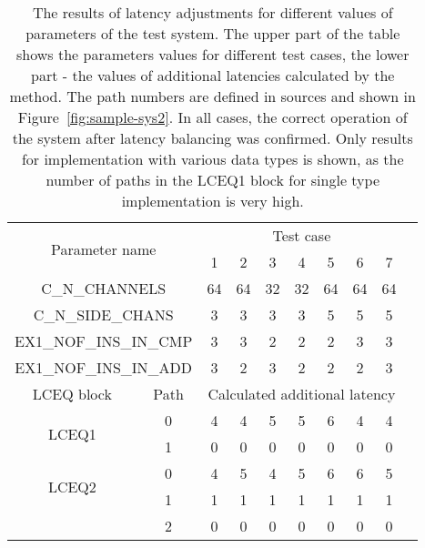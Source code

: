\documentclass[preprint,11pt]{elsarticle}
\begin{document}
\begin{table}[tp]
  \caption[results]
  { \label{tab:results-latencies}
    The results of latency adjustments for different values of parameters of the test system.
    The upper part of the table shows the parameters values for different test cases, the lower
    part - the values of additional latencies calculated by the method. The path numbers are defined
    in sources and shown in Figure~\ref{fig:sample-sys2}.
    In all cases, the correct operation of the system after latency balancing was confirmed.
    Only results for implementation with various data types is shown, as the number of paths
    in the LCEQ1 block for single type implementation is very high.
  }
\begin{center}
{\small
\begin{tabular}{|c|c|c|c|c|c|c|c|c|c|}
\hline
\multicolumn{2}{|c}{\multirow{2}{*}{Parameter name}} &
\multicolumn{7}{|c|}{Test case}\\
\cline{3-9}
\multicolumn{2}{|c|}{}                                 & 1  & 2 & 3 & 4 & 5 & 6 & 7 \\
\hline
\multicolumn{2}{|c|}{C\_N\_CHANNELS}                   & 64 & 64 & 32 & 32  & 64 & 64 & 64 \\
\multicolumn{2}{|c|}{C\_N\_SIDE\_CHANS}                &  3 &  3 &  3 &  3  &  5 &  5 & 5  \\
\multicolumn{2}{|c|}{EX1\_NOF\_INS\_IN\_CMP}           &  3 &  3 &  2 &  2  &  2 &  3 & 3  \\
\multicolumn{2}{|c|}{EX1\_NOF\_INS\_IN\_ADD}           &  3 &  2 &  3 &  2  &  2 &  2 & 3  \\
\hline
\hline
LCEQ block          & Path   & \multicolumn{7}{c|}{Calculated additional latency}\\
\hline
\multirow{2}{*}{LCEQ1} & 0                             & 4  &  4 &  5 &  5 &  6 & 4  & 4  \\
                       & 1                             & 0  &  0 &  0 &  0 &  0 & 0  & 0  \\
\hline
\multirow{2}{*}{LCEQ2} & 0                             & 4  &  5 &  4 &  5 &  6 & 6  & 5  \\
                       & 1                             & 1  &  1 &  1 &  1 &  1 & 1  & 1  \\
                       & 2                             & 0  &  0 &  0 &  0 &  0 & 0  & 0  \\
\hline

\end{tabular}
}
\end{center}
\end{table}
\end{document}
